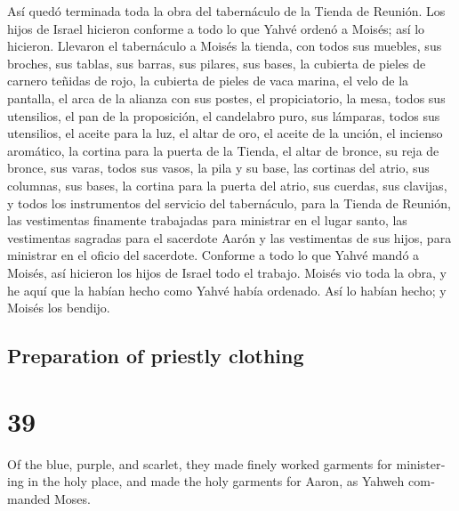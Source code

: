 \begin{paracol}{2}
 Así quedó terminada toda la obra del tabernáculo de la
Tienda de Reunión. Los hijos de Israel hicieron conforme a todo lo que
Yahvé ordenó a Moisés; así lo hicieron.  Llevaron el
tabernáculo a Moisés la tienda, con todos sus muebles, sus broches, sus
tablas, sus barras, sus pilares, sus bases,  la cubierta
de pieles de carnero teñidas de rojo, la cubierta de pieles de vaca
marina, el velo de la pantalla,  el arca de la alianza
con sus postes, el propiciatorio,  la mesa, todos sus
utensilios, el pan de la proposición,  el candelabro
puro, sus lámparas, todos sus utensilios, el aceite para la luz,
 el altar de oro, el aceite de la unción, el incienso
aromático, la cortina para la puerta de la Tienda,  el
altar de bronce, su reja de bronce, sus varas, todos sus vasos, la pila
y su base,  las cortinas del atrio, sus columnas, sus
bases, la cortina para la puerta del atrio, sus cuerdas, sus clavijas, y
todos los instrumentos del servicio del tabernáculo, para la Tienda de
Reunión,  las vestimentas finamente trabajadas para
ministrar en el lugar santo, las vestimentas sagradas para el sacerdote
Aarón y las vestimentas de sus hijos, para ministrar en el oficio del
sacerdote.  Conforme a todo lo que Yahvé mandó a Moisés,
así hicieron los hijos de Israel todo el trabajo.  Moisés
vio toda la obra, y he aquí que la habían hecho como Yahvé había
ordenado. Así lo habían hecho; y Moisés los bendijo.

\switchcolumn
\begin{otherlanguage}{english}

\hypertarget{preparation-of-priestly-clothing}{%
\subsection{Preparation of priestly
clothing}\label{preparation-of-priestly-clothing}}

\hypertarget{section-77}{%
\section{39}\label{section-77}}

 Of the blue, purple, and scarlet, they made finely worked
garments for ministering in the holy place, and made the holy garments
for Aaron, as Yahweh commanded Moses.

\hypertarget{the-shoulder-dress-ephod-1}{%
}
\end{otherlanguage}
\end{paracol}
